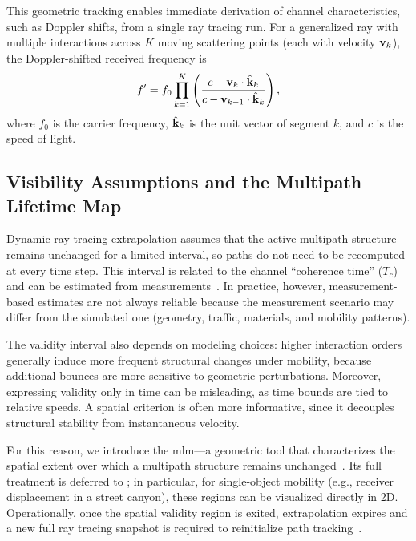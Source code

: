 This geometric tracking enables immediate derivation of channel characteristics, such as Doppler shifts, from a single ray tracing run. For a generalized ray with multiple interactions across $K$ moving scattering points (each with velocity $\mathbf{v}_k$), the Doppler-shifted received frequency is
\begin{equation}
  f' = f_0 \prod_{k=1}^{K} \left( \frac{c - \mathbf{v}_k \cdot \hat{\mathbf{k}}_k}{c - \mathbf{v}_{k-1} \cdot \hat{\mathbf{k}}_k} \right),
\end{equation}
where $f_0$ is the carrier frequency, $\hat{\mathbf{k}}_k$ is the unit vector of segment $k$, and $c$ is the speed of light.

\subsection{Visibility Assumptions and the Multipath Lifetime Map}

Dynamic ray tracing extrapolation assumes that the active multipath structure remains unchanged for a limited interval, so paths do not need to be recomputed at every time step. This interval is related to the channel \enquote{coherence time} ($T_c$) and can be estimated from measurements~. In practice, however, measurement-based estimates are not always reliable because the measurement scenario may differ from the simulated one (geometry, traffic, materials, and mobility patterns).

The validity interval also depends on modeling choices: higher interaction orders generally induce more frequent structural changes under mobility, because additional bounces are more sensitive to geometric perturbations. Moreover, expressing validity only in time can be misleading, as time bounds are tied to relative speeds. A spatial criterion is often more informative, since it decouples structural stability from instantaneous velocity.

For this reason, we introduce the \gls{mlm}---a geometric tool that characterizes the spatial extent over which a multipath structure remains unchanged~. Its full treatment is deferred to ; in particular, for single-object mobility (e.g., receiver displacement in a street canyon), these regions can be visualized directly in 2D. Operationally, once the spatial validity region is exited, extrapolation expires and a new full ray tracing snapshot is required to reinitialize path tracking~.

